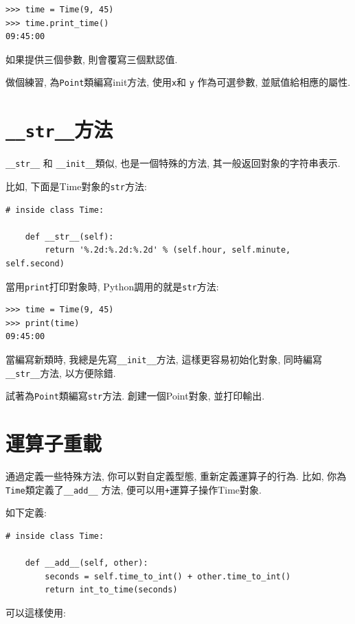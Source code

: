 \documentclass[10pt]{book}
\begin{document}
\begin{verbatim}
>>> time = Time(9, 45)
>>> time.print_time()
09:45:00
\end{verbatim}
%
如果提供三個參數, 則會覆寫三個默認值. 

做個練習, 為{\tt Point}類編寫init方法, 使用{\tt x}和 {\tt y} 作為可選參數, 
並賦值給相應的屬性. 


\section{{\tt \_\_str\_\_}方法}

\verb"__str__" 和 \verb"__init__"類似, 也是一個特殊的方法, 
其一般返回對象的字符串表示. 

比如, 下面是Time對象的{\tt str}方法:

\begin{verbatim}
# inside class Time:

    def __str__(self):
        return '%.2d:%.2d:%.2d' % (self.hour, self.minute, self.second)
\end{verbatim}
%
當用{\tt print}打印對象時, Python調用的就是{\tt str}方法:

\begin{verbatim}
>>> time = Time(9, 45)
>>> print(time)
09:45:00
\end{verbatim}
%
當編寫新類時, 我總是先寫\verb"__init__"方法, 這樣更容易初始化對象, 
同時編寫\verb"__str__"方法, 以方便除錯. 

試著為{\tt Point}類編寫{\tt str}方法. 
創建一個Point對象, 並打印輸出. 


\section{運算子重載}
\label{operator.overloading}

通過定義一些特殊方法, 你可以對自定義型態, 重新定義運算子的行為. 
比如, 你為{\tt Time}類定義了\verb"__add__" 方法, 便可以用{\tt +}運算子操作Time對象. 

如下定義:

\begin{verbatim}
# inside class Time:

    def __add__(self, other):
        seconds = self.time_to_int() + other.time_to_int()
        return int_to_time(seconds)
\end{verbatim}
%
可以這樣使用:
\end{document}
